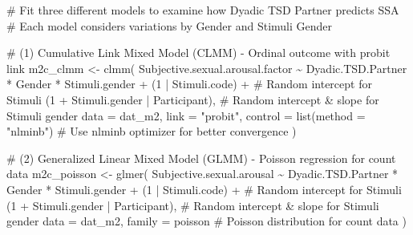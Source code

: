 \documentclass[
  bookmarksnumbered]{article}
\newenvironment{Shaded}{\begin{snugshade}}{\end{snugshade}}
\newcommand{\AttributeTok}[1]{\textcolor[rgb]{0.80,0.80,0.80}{#1}}
\newcommand{\CommentTok}[1]{\textcolor[rgb]{0.50,0.62,0.50}{#1}}
\newcommand{\DecValTok}[1]{\textcolor[rgb]{0.86,0.86,0.80}{#1}}
\newcommand{\FunctionTok}[1]{\textcolor[rgb]{0.94,0.94,0.56}{#1}}
\newcommand{\NormalTok}[1]{\textcolor[rgb]{0.80,0.80,0.80}{#1}}
\newcommand{\OtherTok}[1]{\textcolor[rgb]{0.94,0.94,0.56}{#1}}
\newcommand{\SpecialCharTok}[1]{\textcolor[rgb]{0.86,0.64,0.64}{#1}}
\newcommand{\StringTok}[1]{\textcolor[rgb]{0.80,0.58,0.58}{#1}}
\begin{document}
\begin{Shaded}
\begin{Highlighting}[]
\CommentTok{\# Fit three different models to examine how Dyadic TSD Partner predicts SSA}
\CommentTok{\# Each model considers variations by Gender and Stimuli Gender}

\CommentTok{\# (1) Cumulative Link Mixed Model (CLMM) {-} Ordinal outcome with probit link}
\NormalTok{m2c\_clmm }\OtherTok{\textless{}{-}} \FunctionTok{clmm}\NormalTok{(}
\NormalTok{  Subjective.sexual.arousal.factor }\SpecialCharTok{\textasciitilde{}}\NormalTok{ Dyadic.TSD.Partner }\SpecialCharTok{*}\NormalTok{ Gender }\SpecialCharTok{*}\NormalTok{ Stimuli.gender }\SpecialCharTok{+}
\NormalTok{    (}\DecValTok{1} \SpecialCharTok{|}\NormalTok{ Stimuli.code) }\SpecialCharTok{+} \CommentTok{\# Random intercept for Stimuli}
\NormalTok{    (}\DecValTok{1} \SpecialCharTok{+}\NormalTok{ Stimuli.gender }\SpecialCharTok{|}\NormalTok{ Participant), }\CommentTok{\# Random intercept \& slope for Stimuli gender}
  \AttributeTok{data =}\NormalTok{ dat\_m2,}
  \AttributeTok{link =} \StringTok{"probit"}\NormalTok{,}
  \AttributeTok{control =} \FunctionTok{list}\NormalTok{(}\AttributeTok{method =} \StringTok{"nlminb"}\NormalTok{) }\CommentTok{\# Use \textquotesingle{}nlminb\textquotesingle{} optimizer for better convergence}
\NormalTok{)}

\CommentTok{\# (2) Generalized Linear Mixed Model (GLMM) {-} Poisson regression for count data}
\NormalTok{m2c\_poisson }\OtherTok{\textless{}{-}} \FunctionTok{glmer}\NormalTok{(}
\NormalTok{  Subjective.sexual.arousal }\SpecialCharTok{\textasciitilde{}}\NormalTok{ Dyadic.TSD.Partner }\SpecialCharTok{*}\NormalTok{ Gender }\SpecialCharTok{*}\NormalTok{ Stimuli.gender }\SpecialCharTok{+}
\NormalTok{    (}\DecValTok{1} \SpecialCharTok{|}\NormalTok{ Stimuli.code) }\SpecialCharTok{+} \CommentTok{\# Random intercept for Stimuli}
\NormalTok{    (}\DecValTok{1} \SpecialCharTok{+}\NormalTok{ Stimuli.gender }\SpecialCharTok{|}\NormalTok{ Participant), }\CommentTok{\# Random intercept \& slope for Stimuli gender}
  \AttributeTok{data =}\NormalTok{ dat\_m2,}
  \AttributeTok{family =}\NormalTok{ poisson }\CommentTok{\# Poisson distribution for count data}
\NormalTok{)}


\end{Highlighting}
\end{Shaded}
\end{document}
